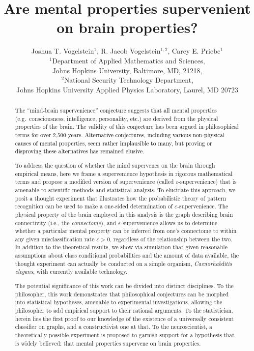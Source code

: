 \documentclass{article}
\title{Are mental properties supervenient on brain properties?}
\author{Joshua T. Vogelstein$^1$, R. Jacob Vogelstein$^{1,2}$, Carey E. Priebe$^1$\\
$^1$Department of Applied Mathematics and Sciences, \\ Johns Hopkins University, Baltimore, MD, 21218,\\ $^2$National Security Technology Department, \\ Johns Hopkins University Applied Physics Laboratory, Laurel, MD 20723}
\providecommand{\tr}[1]{\textcolor{black}{#1}}
\begin{document}
\maketitle
\begin{abstract}


The ``mind-brain supervenience'' \tr{conjecture} suggests that all mental properties (e.g.\ consciousness, intelligence, personality, etc.) are derived from the physical properties of the brain. The validity of this \tr{conjecture} has been argued in philosophical terms for over 2,500 years. \tr{Alternative conjectures, including various non-physical causes of mental properties, seem rather implausible to many, but proving or disproving these alternatives has remained elusive.}  

To address the question of whether the mind supervenes on the brain through empirical means, here we frame a supervenience hypothesis in rigorous mathematical terms and propose a modified version of supervenience (called $\varepsilon$-supervenience) that is amenable to scientific methods and statistical analysis. To elucidate this approach, we posit a thought experiment that illustrates how the probabilistic theory of pattern recognition can be used to make a one-sided determination of $\varepsilon$-supervenience. The physical property of the brain employed in this analysis is the graph describing brain connectivity (i.e., the \emph{connectome}), and $\varepsilon$-supervenience allows us to determine whether a particular mental property can be inferred from one's connectome to within any given misclassification rate $\varepsilon > 0$, regardless of the relationship between the two. In addition to the theoretical results, we show via simulation that given reasonable assumptions about class conditional probabilities and the amount of data available, the thought experiment can actually be conducted on a simple organism, \emph{Caenorhabditis elegans}, with currently available technology.

The potential significance of this work can be divided into distinct disciplines.  To the philosopher, this work demonstrates that philosophical conjectures can be morphed into statistical hypotheses, amenable to experimental investigations, allowing the philosopher to add empirical support to their rational arguments.  To the statistician, herein lies the first proof to our knowledge of the existence of a universally consistent classifier on graphs, and a constructivist one at that.  To the neuroscientist, a theoretically possible experiment is proposed to garnish support for a hypothesis that is widely believed: that mental properties supervene on brain properties.


\end{abstract}
\end{document}
